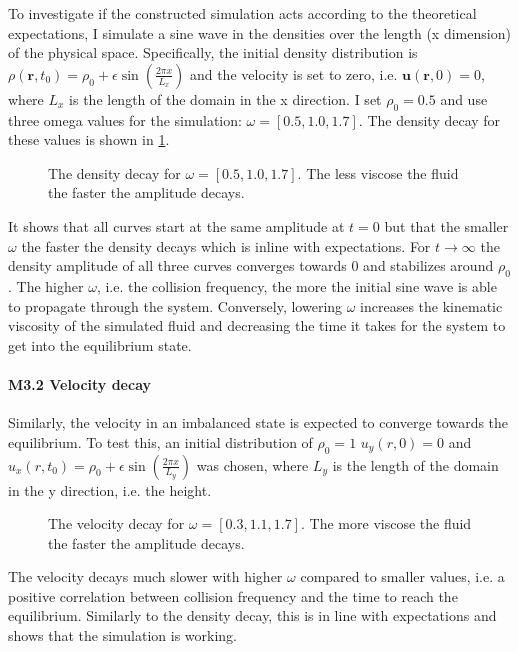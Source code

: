 \documentclass[a4paper,11pt, oneside]{book}
\begin{document}
To investigate if the constructed simulation acts according to the theoretical expectations, I simulate a sine wave in the densities over the length (x dimension) of the physical space.
Specifically, the initial density distribution is $\rho (\textbf{r},t_{0})=\rho_{0}+\epsilon \sin \left( \frac{2\pi x}{L_{x}} \right)$ and the velocity is set to zero, i.e. $\textbf{u}(\textbf{r},0)=0$, where $L_{x}$ is the length of the domain in the x direction.
I set $\rho_{0}=0.5$ and use three omega values for the simulation: $\omega=[0.5,1.0,1.7]$.
The density decay for these values is shown in \ref{fig:m3-1}.
\begin{figure}[ht]
\centering
\resizebox{\columnwidth}{!}{\large}
\vspace*{-10mm}
\caption[Density decay]{The density decay for $\omega=[0.5,1.0,1.7]$. The less viscose the fluid the faster the amplitude decays.}
\label{fig:m3-1}
\end{figure}
It shows that all curves start at the same amplitude at $t=0$ but that the smaller $\omega$ the faster the density decays which is inline with expectations. 
For $t\rightarrow \infty$ the density amplitude of all three curves converges towards $0$ and stabilizes around $\rho_{0}$.
The higher $\omega$, i.e. the collision frequency, the more the initial sine wave is able to propagate through the system. Conversely, lowering $\omega$ increases the kinematic viscosity of the simulated fluid and decreasing the time it takes for the system to get into the equilibrium state.


\paragraph{M3.2 Velocity decay}
Similarly, the velocity in an imbalanced state is expected to converge towards the equilibrium.
To test this, an initial distribution of $\rho_{0}=1$ $u_{y}(r,0)=0$ and $u_{x}(r,t_{0})=\rho_{0}+\epsilon \sin \left( \frac{2\pi x}{L_{y}} \right)$ was chosen, where $L_{y}$ is the length of the domain in the y direction, i.e. the height.
\begin{figure}[ht]
\centering
\resizebox{\columnwidth}{!}{\large}
\vspace*{-10mm}
\caption[Velocity decay]{The velocity decay for $\omega=[0.3,1.1,1.7]$. The more viscose the fluid the faster the amplitude decays.}
\label{fig:m3-2-vel}
\end{figure}
The velocity decays much slower with higher $\omega$ compared to smaller values, i.e. a positive correlation between collision frequency and the time to reach the equilibrium.
Similarly to the density decay, this is in line with expectations and shows that the simulation is working.
\end{document}
